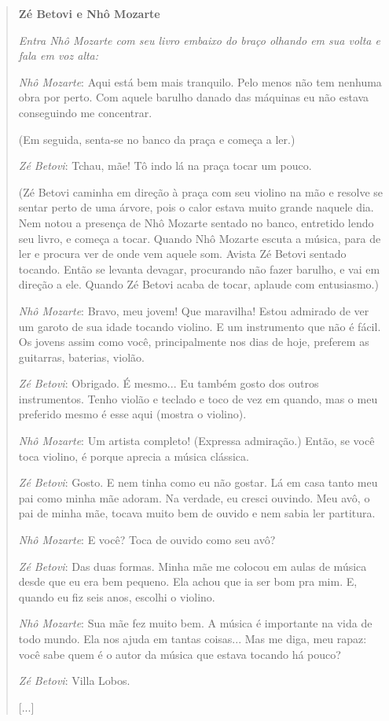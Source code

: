 \begin{quote}
\textbf{Zé Betovi e Nhô Mozarte}

\textit{Entra Nhô Mozarte com seu livro embaixo do braço olhando em
sua volta e fala em voz alta:}

\emph{Nhô Mozarte}: Aqui está bem mais tranquilo. Pelo menos não tem
nenhuma obra por perto. Com aquele barulho danado das máquinas eu não
estava conseguindo me concentrar.

(Em seguida, senta-se no banco da praça e começa a ler.)

\emph{Zé Betovi}: Tchau, mãe! Tô indo lá na praça tocar um pouco.

(Zé Betovi caminha em
direção à praça com seu violino na mão e resolve se sentar perto de uma
árvore, pois o calor estava muito grande naquele dia. Nem notou a
presença de Nhô Mozarte sentado no banco, entretido lendo seu livro, e
começa a tocar. Quando Nhô Mozarte escuta a música, para de ler e
procura ver de onde vem aquele som. Avista Zé Betovi sentado tocando.
Então se levanta devagar, procurando não fazer barulho, e vai em direção
a ele. Quando Zé Betovi acaba de tocar, aplaude com entusiasmo.)

\emph{Nhô Mozarte}: Bravo, meu jovem! Que maravilha! Estou admirado de
ver um garoto de sua idade tocando violino. E um instrumento que não é
fácil. Os jovens assim como você, principalmente nos dias de hoje,
preferem as guitarras, baterias, violão.

\emph{Zé Betovi}: Obrigado. É mesmo... Eu também gosto dos outros
instrumentos. Tenho violão e teclado e toco de vez em quando, mas o meu
preferido mesmo é esse aqui (mostra o violino).

\emph{Nhô Mozarte}: Um artista completo! (Expressa admiração.) Então, se
você toca violino, é porque aprecia a música clássica.

\emph{Zé Betovi}: Gosto. E nem tinha como eu não gostar. Lá em casa
tanto meu pai como minha mãe adoram. Na verdade, eu cresci ouvindo. Meu
avô, o pai de minha mãe, tocava muito bem de ouvido e nem sabia ler
partitura.

\emph{Nhô Mozarte}: E você? Toca de ouvido como seu avô?

\emph{Zé Betovi}: Das duas formas. Minha mãe me colocou em aulas de
música desde que eu era bem pequeno. Ela achou que ia ser bom pra mim.
E, quando eu fiz seis anos, escolhi o violino.

\emph{Nhô Mozarte}: Sua mãe fez muito bem. A música é importante na vida
de todo mundo. Ela nos ajuda em tantas coisas... Mas me diga, meu rapaz:
você sabe quem é o autor da música que estava tocando há pouco?

\emph{Zé Betovi}: Villa Lobos.

{[}...{]}

\end{quote}

